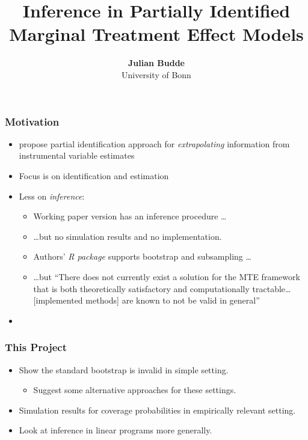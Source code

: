 \documentclass[11pt, aspectratio=169]{beamer}
\begin{document}
\title{Inference in Partially Identified Marginal Treatment Effect Models}

\author[Julian Budde]
{
{\bf Julian Budde}\\
{\small University of Bonn}\\[1ex]
}


\begin{frame}
    \titlepage
    \note{~}
\end{frame}

\begin{frame}
    \frametitle{Motivation}

    \begin{itemize}
        \item \citet{mogstad2018using} propose partial identification approach for \textit{extrapolating} information from instrumental variable estimates
        \item Focus is on identification and estimation
        \item Less on \textit{inference}:
        \begin{itemize}
            \footnotesize
            \item Working paper version has an inference procedure \dots
            \item \dots but no simulation results and no implementation.
            \item Authors' \textit{R package} supports bootstrap and subsampling \dots
            \item \dots but ``There does not currently exist a solution for the MTE framework that is both theoretically
            satisfactory and computationally tractable\dots [implemented methods] are known to not be valid in general''
        \end{itemize}
        \item
    \end{itemize}

\end{frame}

\begin{frame}
    \frametitle{This Project}

    \begin{itemize}
        \item Show the standard bootstrap is invalid in simple setting.
        \begin{itemize}
            \item Suggest some alternative approaches for these settings.
        \end{itemize}
        \item Simulation results for coverage probabilities in empirically relevant setting.
        \item Look at inference in linear programs more generally.
    \end{itemize}

\end{frame}
\end{document}
